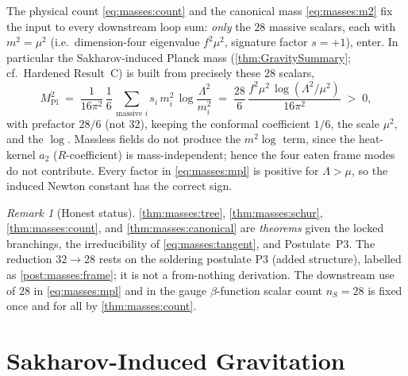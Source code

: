 \documentclass[11pt]{article}
\theoremstyle{plain}
\theoremstyle{definition}
\theoremstyle{remark}
\newtheorem{remark}[theorem]{Remark}
\begin{document}
The physical count \eqref{eq:masses:count} and the canonical mass
\eqref{eq:masses:m2} fix the input to every downstream loop sum: \emph{only}
the $28$ massive scalars, each with $m^{2}=\mu^{2}$ (i.e.\ dimension-four
eigenvalue $f^{2}\mu^{2}$, signature factor $s=+1$), enter. In particular the
Sakharov-induced Planck mass (\autoref{thm:GravitySummary}; cf.\ Hardened
Result~C) is built from precisely these $28$ scalars,
\begin{equation}\label{eq:masses:mpl}
  M_{\mathrm{Pl}}^{2}
  \;=\;
  \frac{1}{16\pi^{2}}\,\frac{1}{6}\,
  \sum_{\text{massive }i} s_{i}\,m_{i}^{2}\,\log\frac{\Lambda^{2}}{m_{i}^{2}}
  \;=\;
  \frac{28}{6}\,\frac{f^{2}\mu^{2}\,\log(\Lambda^{2}/\mu^{2})}{16\pi^{2}}
  \;>\;0,
\end{equation}
with prefactor $28/6$ (not $32$), keeping the conformal coefficient $1/6$, the
scale $\mu^{2}$, and the $\log$. Massless fields do not produce the $m^{2}\log$
term, since the heat-kernel $a_{2}$ ($R$-coefficient) is mass-independent;
hence the four eaten frame modes do not contribute. Every factor in
\eqref{eq:masses:mpl} is positive for $\Lambda>\mu$, so the induced Newton
constant has the correct sign.

\begin{remark}[Honest status]\label{rmk:masses:status}
\autoref{thm:masses:tree}, \autoref{thm:masses:schur},
\autoref{thm:masses:count}, and \autoref{thm:masses:canonical} are
\emph{theorems} given the locked branchings, the irreducibility of
\eqref{eq:masses:tangent}, and Postulate~P3. The reduction $32\to 28$ rests on
the soldering postulate P3 (added structure), labelled as
\autoref{post:masses:frame}; it is not a from-nothing derivation. The downstream
use of $28$ in \eqref{eq:masses:mpl} and in the gauge $\beta$-function scalar
count $n_{S}=28$ is fixed once and for all by \autoref{thm:masses:count}.
\end{remark}


\section{Sakharov-Induced Gravitation}
\label{sec:gravity:main}
\label{sec:grav:main}
\label{sec:gravity}
\end{document}
